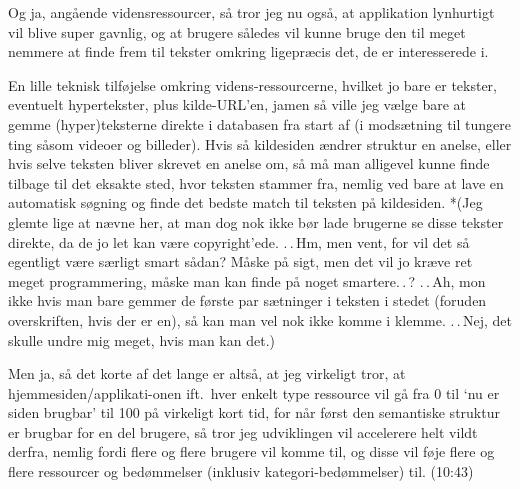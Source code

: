 \documentclass{report}
\begin{document}
Og ja, angående vidensressourcer, så tror jeg nu også, at applikation lynhurtigt vil blive super gavnlig, og at brugere således vil kunne bruge den til meget nemmere at finde frem til tekster omkring ligepræcis det, de er interesserede i. 

En lille teknisk tilføjelse omkring videns-ressourcerne, hvilket jo bare er tekster, eventuelt hypertekster, plus kilde-URL'en, jamen så ville jeg vælge bare at gemme (hyper)teksterne direkte i databasen fra start af (i modsætning til tungere ting såsom videoer og billeder). Hvis så kildesiden ændrer struktur en anelse, eller hvis selve teksten bliver skrevet en anelse om, så må man alligevel kunne finde tilbage til det eksakte sted, hvor teksten stammer fra, nemlig ved bare at lave en automatisk søgning og finde det bedste match til teksten på kildesiden. *(Jeg glemte lige at nævne her, at man dog nok ikke bør lade brugerne se disse tekster direkte, da de jo let kan være copyright'ede. .\,.\,Hm, men vent, for vil det så egentligt være særligt smart sådan? Måske på sigt, men det vil jo kræve ret meget programmering, måske man kan finde på noget smartere.\,.\,? .\,.\,Ah, mon ikke hvis man bare gemmer de første par sætninger i teksten i stedet (foruden overskriften, hvis der er en), så kan man vel nok ikke komme i klemme. .\,.\,Nej, det skulle undre mig meget, hvis man kan det.)

Men ja, så det korte af det lange er altså, at jeg virkeligt tror, at hjemmesiden/applikati-onen ift.\ hver enkelt type ressource vil gå fra 0 til `nu er siden brugbar' til 100 på virkeligt kort tid, for når først den semantiske struktur er brugbar for en del brugere, så tror jeg udviklingen vil accelerere helt vildt derfra, nemlig fordi flere og flere brugere vil komme til, og disse vil føje flere og flere ressourcer og bedømmelser (inklusiv kategori-bedømmelser) til. (10:43)
\end{document}
